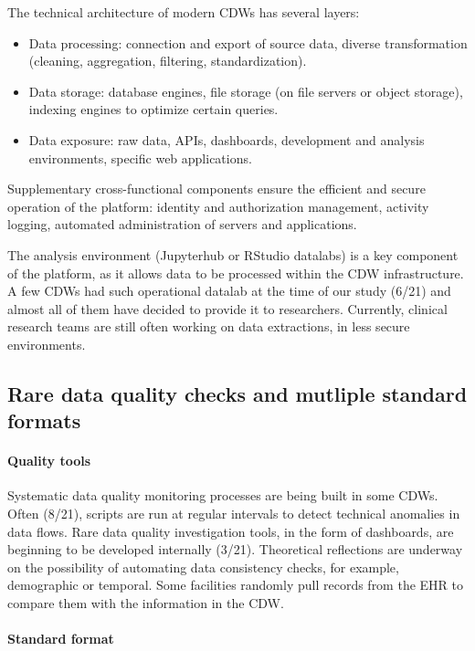 \documentclass[french,12pt,twoside,a4paper]{book}
\begin{document}
The technical architecture of modern CDWs has several layers:
\begin{itemize}
  \item Data processing: connection and export of source data, diverse
        transformation (cleaning, aggregation, filtering, standardization).
  \item Data storage: database engines, file storage (on file servers or object
        storage), indexing engines to optimize certain queries.
  \item Data exposure: raw data, APIs, dashboards, development and analysis
        environments, specific web applications.
\end{itemize}
Supplementary cross-functional components ensure the efficient and secure
operation of the platform: identity and authorization management, activity
logging, automated administration of servers and applications.

The analysis environment (Jupyterhub or RStudio datalabs) is a key component of
the platform, as it allows data to be processed within the CDW infrastructure. A
few CDWs had such operational datalab at the time of our study (6/21) and almost
all of them have decided to provide it to researchers. Currently, clinical
research teams are still often working on data extractions, in less secure
environments.

\subsection{Rare data quality checks and mutliple standard formats}%
\label{subsec:cdw:results:data_quality}%

\paragraph{Quality tools}

Systematic data quality monitoring processes are
being built in some CDWs. Often (8/21), scripts are run at regular intervals to
detect technical anomalies in data flows. Rare data quality investigation tools,
in the form of dashboards, are beginning to be developed internally (3/21).
Theoretical reflections are underway on the possibility of automating data
consistency checks, for example, demographic or temporal. Some facilities
randomly pull records from the EHR to compare them with the information in the
CDW.

\paragraph{Standard format}
\end{document}
